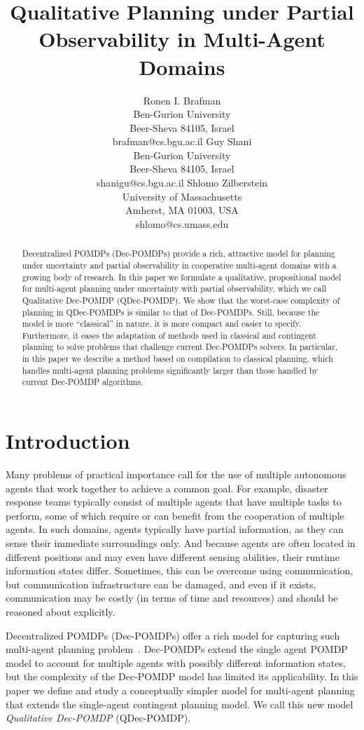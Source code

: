 \documentclass[letterpaper]{article}
\title{Qualitative Planning under Partial Observability in Multi-Agent Domains}
\author{
Ronen I. Brafman \\
      Ben-Gurion University \\
      Beer-Sheva 84105, Israel\\
      brafman@cs.bgu.ac.il
\And Guy Shani\\
      Ben-Gurion University \\
      Beer-Sheva 84105, Israel\\
      shanigu@cs.bgu.ac.il
\And
Shlomo Zilberstein\\
      University of Massachusetts\\
      Amherst, MA 01003, USA\\
      shlomo@cs.umass.edu}
\theoremstyle{definition}
\begin{document}
\maketitle

\begin{abstract}
Decentralized POMDPs (Dec-POMDPs) provide a rich, attractive model for planning under uncertainty and partial observability in cooperative multi-agent domains with a growing body of research. In this paper we formulate a qualitative, propositional model for multi-agent planning under uncertainty with partial observability, which we call Qualitative Dec-POMDP (QDec-POMDP). We show that the worst-case complexity of planning in QDec-POMDPs is similar to that of Dec-POMDPs. Still, because the model is more ``classical'' in nature, it is more compact and easier to specify.  Furthermore, it eases the adaptation of methods used in classical and contingent planning to solve problems %
that challenge current Dec-POMDPs solvers.
In particular, in this paper we describe a method based on compilation to classical planning, which handles multi-agent planning problems significantly larger than those handled by current Dec-POMDP algorithms.
\end{abstract}

\section{Introduction}
Many problems of practical importance call for the use of multiple autonomous agents that work together to achieve a common goal.
For example, disaster response teams typically consist of multiple agents that have multiple tasks to perform,
some of which
require or can benefit from the cooperation of multiple agents. In such domains, agents typically have partial information, as they can sense their immediate surroundings only.
And because agents are often located in different positions and may even have different sensing abilities, their runtime information states differ.  Sometimes, this can be overcome using communication, but communication infrastructure can be damaged, and even if it exists,
communication may be costly (in terms of time and resources) and should be reasoned about explicitly.

Decentralized POMDPs (Dec-POMDPs) offer a rich model for capturing such multi-agent planning problem~\cite{Bernstein02,Seuken08}. Dec-POMDPs extend the single agent POMDP model to account for multiple agents with possibly different information states, but the complexity of the Dec-POMDP model has limited its applicability.  In this paper we define and study a conceptually simpler model for multi-agent planning that extends the single-agent contingent planning model.  We call this new model \emph{Qualitative Dec-POMDP} (QDec-POMDP).
\end{document}
